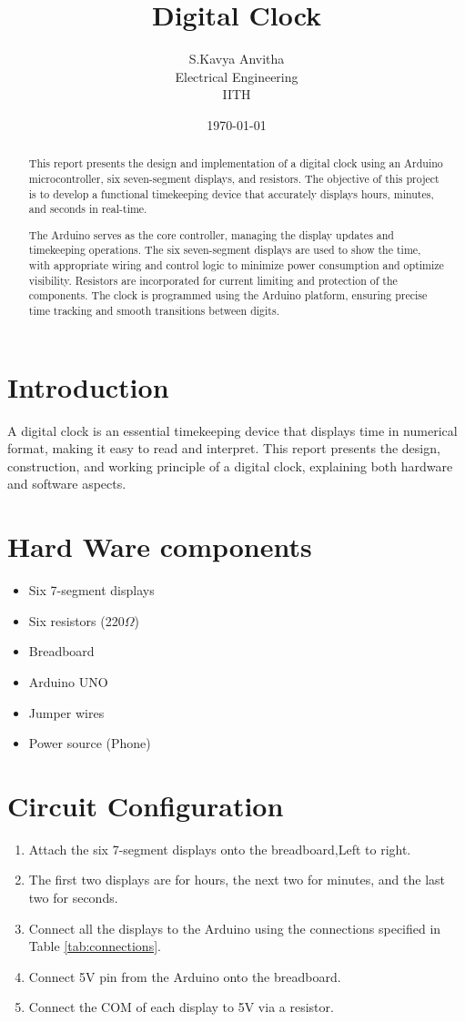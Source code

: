 \documentclass[a4paper,12pt]{article}
\title{\textbf{Digital Clock}}
\author{S.Kavya Anvitha\\ Electrical Engineering \\ IITH}
\date{\today}
\begin{document}
\maketitle

\begin{abstract}
This report presents the design and implementation of a digital clock using an Arduino microcontroller, six seven-segment displays, and resistors. The objective of this project is to develop a functional timekeeping device that accurately displays hours, minutes, and seconds in real-time.

The Arduino serves as the core controller, managing the display updates and timekeeping operations. The six seven-segment displays are used to show the time, with appropriate wiring and control logic to minimize power consumption and optimize visibility. Resistors are incorporated for current limiting and protection of the components. The clock is programmed using the Arduino platform, ensuring precise time tracking and smooth transitions between digits.
\end{abstract}

\tableofcontents
\newpage

\section{Introduction}
A digital clock is an essential timekeeping device that displays time in numerical format, making it easy to read and interpret. This report presents the design, construction, and working principle of a digital clock, explaining both hardware and software aspects.
\section{Hard Ware components}
\begin{itemize}
    \item Six 7-segment displays
    \item Six resistors (220$\Omega$)
    \item Breadboard
    \item  Arduino UNO   
    \item Jumper wires
    \item Power source (Phone)
\end{itemize}
\section{Circuit Configuration}
\begin{enumerate}
    \item Attach the six 7-segment displays onto the breadboard,Left to right.
    \item The first two displays are for hours, the next two for minutes, and the last two for seconds.
    \item Connect all the displays to the Arduino using the connections specified in Table \ref{tab:connections}.
    \item Connect 5V pin from the Arduino onto the breadboard.
    \item Connect the COM of each display to 5V via a resistor.
\end{enumerate}

\newpage
\end{document}

